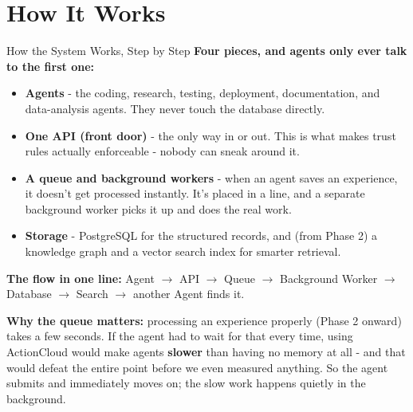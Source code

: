\documentclass{beamer}
\begin{document}
\section{How It Works}
\begin{frame}{How the System Works, Step by Step}
\textbf{Four pieces, and agents only ever talk to the first one:}
\begin{itemize}
    \item \textbf{Agents} - the coding, research, testing, deployment, documentation, and data-analysis agents. They never touch the database directly.
    \item \textbf{One API (front door)} - the only way in or out. This is what makes trust rules actually enforceable - nobody can sneak around it.
    \item \textbf{A queue and background workers} - when an agent saves an experience, it doesn't get processed instantly. It's placed in a line, and a separate background worker picks it up and does the real work.
    \item \textbf{Storage} - PostgreSQL for the structured records, and (from Phase 2) a knowledge graph and a vector search index for smarter retrieval.
\end{itemize}

\vspace{0.2cm}
\textbf{The flow in one line:} \scriptsize Agent $\rightarrow$ API $\rightarrow$ Queue $\rightarrow$ Background Worker $\rightarrow$ Database $\rightarrow$ Search $\rightarrow$ another Agent finds it.

\vspace{0.2cm}\normalsize
\textbf{Why the queue matters:} processing an experience properly (Phase 2 onward) takes a few seconds. If the agent had to wait for that every time, using ActionCloud would make agents \textbf{slower} than having no memory at all - and that would defeat the entire point before we even measured anything. So the agent submits and immediately moves on; the slow work happens quietly in the background.
\end{frame}
\end{document}
